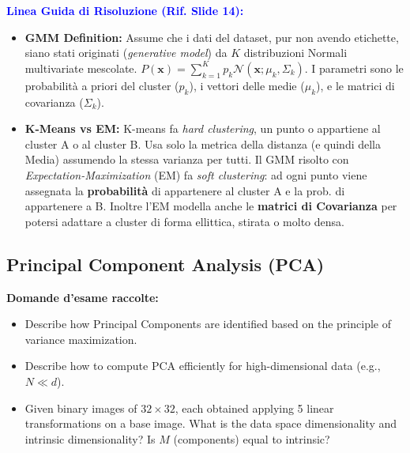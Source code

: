 \documentclass[11pt,a4paper]{article}
\begin{document}
\textbf{\textcolor{blue}{Linea Guida di Risoluzione (Rif. Slide 14):}}
\begin{itemize}
    \item \textbf{GMM Definition:} Assume che i dati del dataset, pur non avendo etichette, siano stati originati (\textit{generative model}) da $K$ distribuzioni Normali multivariate mescolate. $P(\mathbf{x}) = \sum_{k=1}^K p_k \mathcal{N}(\mathbf{x} ; \mu_k, \Sigma_k)$. I parametri sono le probabilità a priori del cluster ($p_k$), i vettori delle medie ($\mu_k$), e le matrici di covarianza ($\Sigma_k$).
    \item \textbf{K-Means vs EM:} K-means fa \textit{hard clustering}, un punto o appartiene al cluster A o al cluster B. Usa solo la metrica della distanza (e quindi della Media) assumendo la stessa varianza per tutti. Il GMM risolto con \textit{Expectation-Maximization} (EM) fa \textit{soft clustering}: ad ogni punto viene assegnata la \textbf{probabilità} di appartenere al cluster A e la prob. di appartenere a B. Inoltre l'EM modella anche le \textbf{matrici di Covarianza} per potersi adattare a cluster di forma ellittica, stirata o molto densa.
\end{itemize}

\subsection{Principal Component Analysis (PCA)}
\textbf{Domande d'esame raccolte:}
\begin{itemize}
    \item Describe how Principal Components are identified based on the principle of variance maximization.
    \item Describe how to compute PCA efficiently for high-dimensional data (e.g., $N \ll d$).
    \item Given binary images of $32 \times 32$, each obtained applying 5 linear transformations on a base image. What is the data space dimensionality and intrinsic dimensionality? Is $M$ (components) equal to intrinsic?
\end{itemize}
\end{document}
